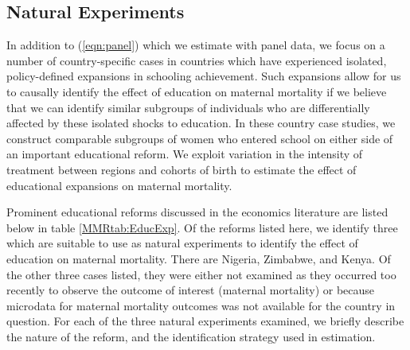 \documentclass{article}[12pt,subeqn]
\begin{document}
\begin{spacing}{1.4}
\subsection{Natural Experiments}
\label{scn:empiricalexperiment}
In addition to (\ref{eqn:panel}) which we estimate with panel data, we focus on a 
number of country-specific cases in countries which have experienced isolated, 
policy-defined expansions in schooling achievement. Such expansions allow for us 
to causally identify the effect of education on maternal mortality if we believe 
that we can identify similar subgroups of individuals who are differentially 
affected by these isolated shocks to education. In these country case studies, we 
construct comparable subgroups of women who entered school on either side of an 
important educational reform.  We exploit variation in the intensity of treatment 
between regions and cohorts of birth to estimate the effect of educational 
expansions on maternal mortality.

Prominent educational reforms discussed in the economics literature are listed 
below in table \ref{MMRtab:EducExp}.  Of the reforms listed here, we identify 
three which are suitable to use as natural experiments to identify the effect of 
education on maternal mortality.  There are Nigeria, Zimbabwe, and Kenya. Of the 
other three cases listed, they were either not examined as they occurred too 
recently to observe the outcome of interest (maternal mortality) or because 
microdata for maternal mortality outcomes was not available for the country in 
question. For each of the three natural experiments examined, we briefly describe 
the nature of the reform, and the identification strategy used in estimation.


\end{spacing}
\end{document}
